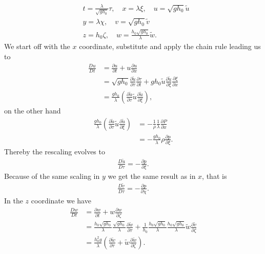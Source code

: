 \begin{align}
    &t = \frac{\lambda}{\sqrt{gh_0}}\tau,\quad x = \lambda \xi,\quad u =
    \sqrt{gh_0} \tilde{u}\\
    &y = \lambda \chi,\quad v = \sqrt{gh_0} \tilde{v}\\
    &z = h_0 \zeta, \quad w = \frac{h_0\sqrt{gh_0} }{\lambda}\tilde{w}.
\end{align}
We start off with the $x$ coordinate, substitute and apply the chain rule
leading us to
\begin{align}
    \frac{Du}{Dt}
    &= \frac{\partial u}{\partial t} +u \frac{\partial
    u}{\partial x} \\
    &= \sqrt{gh_{0}}\frac{\partial \tilde{u}}{\partial \tau} \frac{\partial
    \tau}{\partial t} +gh_0 \tilde{u} \frac{\partial \tilde{u}}{\partial \xi}
    \frac{\partial \xi}{\partial x} \\
    &= \frac{gh_0}{\lambda} \left( \frac{\partial \tilde{u}}{\partial \tau}
    \tilde{u} \frac{\partial \tilde{u}}{\partial \xi} \right),
\end{align}
on the other hand
\begin{align}
    \frac{gh_0}{\lambda} \left( \frac{\partial \tilde{u}}{\partial \tau}
    \tilde{u} \frac{\partial \tilde{u}}{\partial \xi} \right)
    &=-\frac{1}{\rho}\frac{1}{\lambda}\frac{\partial P}{\partial x} \\
    &=-\frac{ g h_0 }{\lambda}\rho \frac{\partial p}{\partial \xi}.
\end{align}
Thereby the rescaling evolves to
\begin{align}
    \frac{D \tilde{u}}{D\tau} = -\frac{\partial p}{\partial \xi}.
\end{align}
Because of the same scaling in $y$ we get the same result as in $x$, that is
\begin{align}
    \frac{D \tilde{v}}{D\tau} = -\frac{\partial p}{\partial \chi}.
\end{align}
In the $z$ coordinate we have
\begin{align}
    \frac{Dw}{Dt}
    &= \frac{\partial w}{\partial t} +w \frac{\partial
    w}{\partial \zeta} \\
    &= \frac{h_0\sqrt{gh_0}}{\lambda} \frac{\sqrt{gh_0}}{\lambda}
    \frac{\partial \tilde{w}}{\partial \tau}  + \frac{1}{h_0}
    \frac{h_0\sqrt{gh_0} }{\lambda} \frac{h_0\sqrt{gh_0}}{\lambda}
    \tilde{w}\frac{\partial \tilde{v}}{\partial \zeta}\\
    &= \frac{h_0^2g}{\lambda}\left( \frac{\partial \tilde{w}}{\partial \tau}
    + \tilde{w}\frac{\partial \tilde{w}}{\partial \zeta} \right) .
\end{align}
